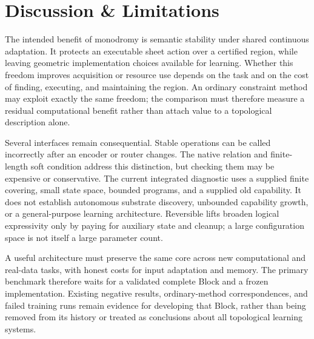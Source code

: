 \section{Discussion \& Limitations}
\label{sec:discussion}

The intended benefit of monodromy is semantic stability under shared continuous
adaptation. It protects an executable sheet action over a certified region,
while leaving geometric implementation choices available for learning. Whether
this freedom improves acquisition or resource use depends on the task and on
the cost of finding, executing, and maintaining the region. An ordinary
constraint method may exploit exactly the same freedom; the comparison must
therefore measure a residual computational benefit rather than attach value
to a topological description alone.

Several interfaces remain consequential. Stable operations can be called
incorrectly after an encoder or router changes. The native relation and
finite-length soft condition address this distinction, but checking them may
be expensive or conservative. The current integrated diagnostic uses a supplied
finite covering, small state space, bounded programs, and a supplied old
capability. It does not establish autonomous substrate discovery, unbounded
capability growth, or a general-purpose learning architecture. Reversible
lifts broaden logical expressivity only by paying for auxiliary state and
cleanup; a large configuration space is not itself a large parameter count.

A useful architecture must preserve the same core across new computational
and real-data tasks, with honest costs for input adaptation and memory. The
primary benchmark therefore waits for a validated complete Block and a frozen
implementation. Existing negative results, ordinary-method correspondences,
and failed training runs remain evidence for developing that Block, rather
than being removed from its history or treated as conclusions about all
topological learning systems.
